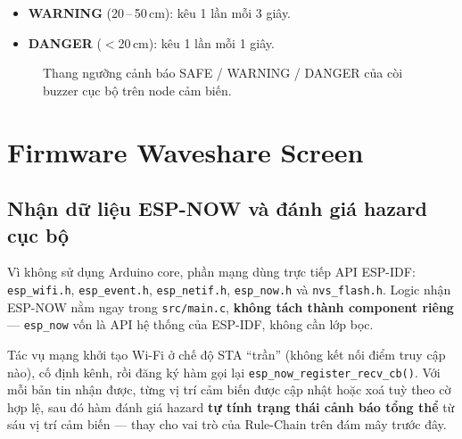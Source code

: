 \documentclass[a4paper,12pt]{article}
\newcommand{\code}[1]{\texttt{#1}}
\begin{document}
\begin{itemize}[nosep]
    \item \textbf{WARNING} (20\,--\,50\,cm): kêu 1 lần mỗi 3 giây.
    \item \textbf{DANGER} ($<$20\,cm): kêu 1 lần mỗi 1 giây.
\end{itemize}

\begin{figure}[H]
\centering
{}
\caption{Thang ngưỡng cảnh báo SAFE / WARNING / DANGER của còi buzzer cục bộ trên node cảm biến.}
\end{figure}

\section{Firmware Waveshare Screen}

\subsection{Nhận dữ liệu ESP-NOW và đánh giá hazard cục bộ}

Vì không sử dụng Arduino core, phần mạng dùng trực tiếp API ESP-IDF: \code{esp\_wifi.h}, \code{esp\_event.h}, \code{esp\_netif.h}, \code{esp\_now.h} và \code{nvs\_flash.h}. Logic nhận ESP-NOW nằm ngay trong \code{src/main.c}, \textbf{không tách thành component riêng} — \code{esp\_now} vốn là API hệ thống của ESP-IDF, không cần lớp bọc.

Tác vụ mạng khởi tạo Wi-Fi ở chế độ STA ``trần'' (không kết nối điểm truy cập nào), cố định kênh, rồi đăng ký hàm gọi lại \code{esp\_now\_register\_recv\_cb()}. Với mỗi bản tin nhận được, từng vị trí cảm biến được cập nhật hoặc xoá tuỳ theo cờ hợp lệ, sau đó hàm đánh giá hazard \textbf{tự tính trạng thái cảnh báo tổng thể} từ sáu vị trí cảm biến — thay cho vai trò của Rule-Chain trên đám mây trước đây.
\end{document}
